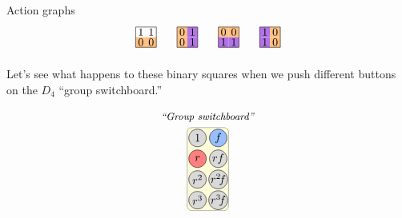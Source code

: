 \documentclass[8pt,handout]{beamer}
\newcommand{\Pause}{}      %
\begin{document}
\begin{frame}{Action graphs}
\[\begin{tikzpicture}[scale=.65]
\begin{scope}[shift={(6,0)}]
      \path[fill=actOrange] (0,0) rectangle ++(.5,.5);
      \path[fill=actOrange] (.5,0) rectangle ++(.5,.5);
      \draw (0,0) rectangle (1,1);
      \draw (.25,.75) node{$1$}; \draw (.75,.75) node{$1$};
      \draw (.25,.25) node{$0$}; \draw (.75,.25) node{$0$};
    \end{scope}
    \begin{scope}[shift={(8,0)}]
      \path[fill=actOrange] (0,.5) rectangle ++(.5,.5); 
      \path[fill=actPurple] (.5,.5) rectangle ++(.5,.5);
      \path[fill=actOrange] (0,0) rectangle ++(.5,.5);
      \path[fill=actPurple] (.5,0) rectangle ++(.5,.5);
      \draw (0,0) rectangle (1,1);
      \draw (.25,.75) node{$0$}; \draw (.75,.75) node{$1$};
      \draw (.25,.25) node{$0$}; \draw (.75,.25) node{$1$};
    \end{scope}
    \begin{scope}[shift={(10,0)}]
      \path[fill=actOrange] (0,.5) rectangle ++(.5,.5); 
      \path[fill=actOrange] (.5,.5) rectangle ++(.5,.5);
      \path[fill=actPurple] (0,0) rectangle ++(.5,.5);
      \path[fill=actPurple] (.5,0) rectangle ++(.5,.5);
      \draw (0,0) rectangle (1,1);
      \draw (.25,.75) node{$0$}; \draw (.75,.75) node{$0$};
        \draw (.25,.25) node{$1$}; \draw (.75,.25) node{$1$};
    \end{scope}
    \begin{scope}[shift={(12,0)}]
      \path[fill=actPurple] (0,.5) rectangle ++(.5,.5); 
      \path[fill=actOrange] (.5,.5) rectangle ++(.5,.5);
      \path[fill=actPurple] (0,0) rectangle ++(.5,.5);
      \path[fill=actOrange] (.5,0) rectangle ++(.5,.5);
      \draw (0,0) rectangle (1,1);
      \draw (.25,.75) node{$1$}; \draw (.75,.75) node{$0$};
      \draw (.25,.25) node{$1$}; \draw (.75,.25) node{$0$};
    \end{scope}
  \end{tikzpicture}
  \]

  \Pause%

  Let's see what happens to these binary squares when we push different buttons on the $D_4$ ``group switchboard.''

  \[
  \begin{tikzpicture}[scale=.65]
      \tikzstyle{v} = [circle, draw, fill=lightgray,inner sep=0pt, 
        minimum size=5.5mm]
      \node at (.5,4) {\small \emph{``Group switchboard''}};
      \draw [midgray,fill=vYellow!50,rounded corners] (-.5,-.5)
      rectangle ++(2,4); 
      \node at (0,3) [v] {$1$}; \node at (1,3) [v,fill=vBlue] {$f$};
      \node at (0,2) [v,fill=vRed] {$r$}; \node at (1,2) [v] {$rf$};
      \node at (0,1) [v] {$r^2$}; \node at (1,1) [v] {$r^2\!f$};
      \node at (0,0) [v] {$r^3$}; \node at (1,0) [v] {$r^3\!f$};
  \end{tikzpicture}
  \]

\end{frame}
\end{document}
